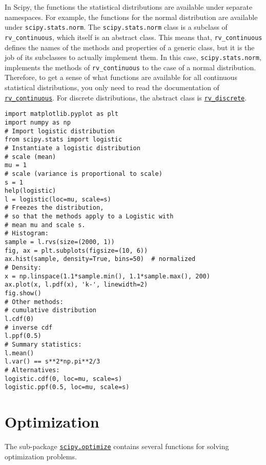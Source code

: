 \documentclass[12pt, a4paper]{article}
\begin{document}
In Scipy, the functions the statistical distributions are available under separate namespaces.
For example, the functions for the normal distribution are available under \texttt{scipy.stats.norm}.
The \texttt{scipy.stats.norm} class is a subclass of \texttt{rv\_continuous}, which itself is an abstract class.
This means that, \texttt{rv\_continuous} defines the names of the methods and properties of a generic class, but it is the job of its subclasses to actually implement them.
In this case, \texttt{scipy.stats.norm}, implements the methods of \texttt{rv\_continuous} to the case of a normal distribution.
Therefore, to get a sense of what functions are available for all continuous statistical distributions, you only need to read the documentation of \href{https://docs.scipy.org/doc/scipy/reference/generated/scipy.stats.rv\_continuous.html\#scipy-stats-rv-continuous}{\texttt{rv\_continuous}}.
For discrete distributions, the abstract class is \href{https://docs.scipy.org/doc/scipy/reference/generated/scipy.stats.rv\_discrete.html\#scipy-stats-rv-discrete}{\texttt{rv\_discrete}}.

\lstset{language=jupyter-python,label= ,caption= ,captionpos=b,numbers=none}
\begin{lstlisting}
import matplotlib.pyplot as plt
import numpy as np
# Import logistic distribution
from scipy.stats import logistic
# Instantiate a logistic distribution
# scale (mean)
mu = 1
# scale (variance is proportional to scale)
s = 1
help(logistic)
l = logistic(loc=mu, scale=s)
# Freezes the distribution,
# so that the methods apply to a Logistic with
# mean mu and scale s.
# Histogram:
sample = l.rvs(size=(2000, 1))
fig, ax = plt.subplots(figsize=(10, 6))
ax.hist(sample, density=True, bins=50)  # normalized
# Density:
x = np.linspace(1.1*sample.min(), 1.1*sample.max(), 200)
ax.plot(x, l.pdf(x), 'k-', linewidth=2)
fig.show()
# Other methods:
# cumulative distribution
l.cdf(0)
# inverse cdf
l.ppf(0.5)
# Summary statistics:
l.mean()
l.var() == s**2*np.pi**2/3
# Alternatives:
logistic.cdf(0, loc=mu, scale=s)
logistic.ppf(0.5, loc=mu, scale=s)
\end{lstlisting}
\section{Optimization}
\label{sec:org1d17c16}
The sub-package \href{https://docs.scipy.org/doc/scipy-1.3.0/reference/tutorial/optimize.html}{\texttt{scipy.optimize}} contains several functions for solving optimization problems.
\end{document}
